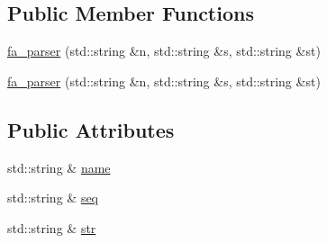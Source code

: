 \subsection*{Public Member Functions}
\begin{DoxyCompactItemize}
\item 
\hyperlink{structfa__parser_a831f54931d3c7c92416997254c164056}{fa\+\_\+parser} (std\+::string \&n, std\+::string \&s, std\+::string \&st)
\item 
\hyperlink{structfa__parser_a831f54931d3c7c92416997254c164056}{fa\+\_\+parser} (std\+::string \&n, std\+::string \&s, std\+::string \&st)
\end{DoxyCompactItemize}
\subsection*{Public Attributes}
\begin{DoxyCompactItemize}
\item 
std\+::string \& \hyperlink{structfa__parser_a1810d6ee1e514d5881b7533dc48aa255}{name}
\item 
std\+::string \& \hyperlink{structfa__parser_aa1da8bfd10cf6fcd917d552a1620aa7c}{seq}
\item 
std\+::string \& \hyperlink{structfa__parser_a8a5f4b32bd12a9c4aa27b5a8dc830c5c}{str}
\end{DoxyCompactItemize}


